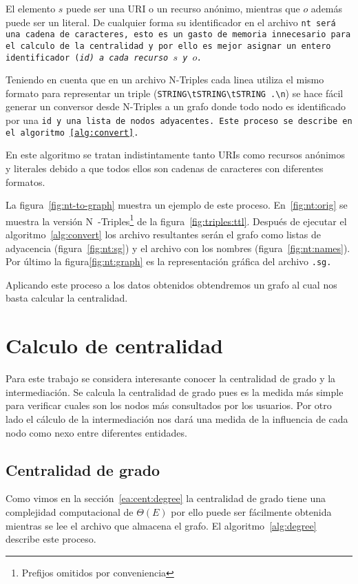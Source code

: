 El elemento $s$ puede ser una URI o un recurso anónimo, mientras que $o$ además
puede ser un literal. De cualquier forma su identificador en el archivo \tt{nt}
será una cadena de caracteres, esto es un gasto de memoria innecesario para el
calculo de la centralidad y por ello es mejor asignar un entero identificador 
(\it{id}) a cada recurso $s$ y $o$.

Teniendo en cuenta que en un archivo N-Triples cada linea utiliza el mismo
formato para representar un triple (\verb$STRING\tSTRING\tSTRING .\n$) se hace
fácil generar un conversor desde N-Triples a un grafo donde todo nodo es
identificado por una \tt{id} y una lista de nodos adyacentes.
Este proceso se describe en el algoritmo~\ref{alg:convert}.



En este algoritmo se tratan indistintamente tanto URIs como recursos anónimos y
literales debido a que todos ellos son cadenas de caracteres con
diferentes formatos.

La figura~\ref{fig:nt-to-graph} muestra un ejemplo de este proceso.
En~\ref{fig:nt:orig} se muestra la versión N~-Triples\footnote{Prefijos omitidos
por conveniencia} de la figura~\ref{fig:triples:ttl}.
Después de ejecutar el algoritmo~\ref{alg:convert} los archivo resultantes serán
el grafo como listas de adyacencia (figura~\ref{fig:nt:sg}) y el archivo con los
nombres (figura~\ref{fig:nt:names}). Por último la figura\ref{fig:nt:graph} es
la representación gráfica del archivo \tt{.sg}.



Aplicando este proceso a los datos obtenidos obtendremos un grafo al cual nos
basta calcular la centralidad.

\section{Calculo de centralidad}\label{d:cc}
Para este trabajo se considera interesante conocer la centralidad de grado y la
intermediación. Se calcula la centralidad de grado pues es la medida más simple
para verificar cuales son los nodos más consultados por los usuarios. Por otro
lado el cálculo de la intermediación nos dará una medida de la influencia de
cada nodo como nexo entre diferentes entidades.

\subsection{Centralidad de grado}
Como vimos en la sección~\ref{ea:cent:degree} la centralidad de grado tiene una
complejidad computacional de $\Theta (E)$ por ello puede ser fácilmente obtenida
mientras se lee el archivo que almacena el grafo. El algoritmo~\ref{alg:degree}
describe este proceso.

